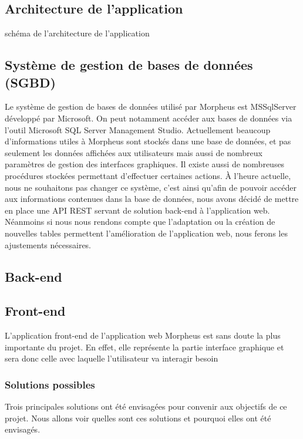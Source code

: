 \documentclass[a4paper, 12pt, french]{article}
\begin{document}

		\subsection{Architecture de l'application}
			schéma de l'architecture de l'application

		\subsection{Système de gestion de bases de données (SGBD)}
			Le système de gestion de bases de données utilisé par Morpheus est MSSqlServer développé par Microsoft. On peut notamment accéder aux bases de données via l'outil Microsoft SQL Server Management Studio.
			Actuellement beaucoup d'informations utiles à Morpheus sont stockés dans une base de données, et pas seulement les données affichées aux utilisateurs mais aussi de nombreux paramètres de gestion des interfaces graphiques. Il existe aussi de nombreuses procédures stockées permettant d'effectuer certaines actions. À l'heure actuelle, nous ne souhaitons pas changer ce système, c'est ainsi qu'afin de pouvoir accéder aux informations contenues dans la base de données, nous avons décidé de mettre en place une API REST servant de solution back-end à l'application web. Néanmoins si nous nous rendons compte que l'adaptation ou la création de nouvelles tables permettent l'amélioration de l'application web, nous ferons les ajustements nécessaires.

		\subsection{Back-end}
			
			
		\subsection{Front-end}
			L'application front-end de l'application web Morpheus est sans doute la plus importante du projet. En effet, elle représente la partie interface graphique et sera donc celle avec laquelle l'utilisateur va interagir besoin
	
			\subsubsection{Solutions possibles}
				Trois principales solutions ont été envisagées pour convenir aux objectifs de ce projet. Nous allons voir quelles sont ces solutions et pourquoi elles ont été envisagés.
\end{document}

